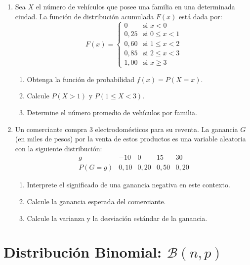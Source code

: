 \documentclass[letterpaper,12pt,spanish]{article}
\begin{document}
\begin{enumerate}[label=\arabic*.]
    \item Sea $X$ el número de vehículos que posee una familia en una determinada ciudad. La función de distribución acumulada $F(x)$ está dada por:
    \[
    F(x) = \begin{cases} 
    0 & \text{si } x < 0 \\
    0{,}25 & \text{si } 0 \le x < 1 \\
    0{,}60 & \text{si } 1 \le x < 2 \\
    0{,}85 & \text{si } 2 \le x < 3 \\
    1{,}00 & \text{si } x \ge 3
    \end{cases}
    \]
    \begin{enumerate}[label=\alph*)]
        \item Obtenga la función de probabilidad $f(x) = P(X = x)$.
        \item Calcule $P(X > 1)$ y $P(1 \le X < 3)$.
        \item Determine el número promedio de vehículos por familia.
    \end{enumerate}

    \item Un comerciante compra 3 electrodomésticos para su reventa. La ganancia $G$ (en miles de pesos) por la venta de estos productos es una variable aleatoria con la siguiente distribución:
    \[
    \begin{array}{c|cccc}
    g & -10 & 0 & 15 & 30 \\ \hline
    P(G = g) & 0{,}10 & 0{,}20 & 0{,}50 & 0{,}20
    \end{array}
    \]
    \begin{enumerate}[label=\alph*)]
        \item Interprete el significado de una ganancia negativa en este contexto.
        \item Calcule la ganancia esperada del comerciante.
        \item Calcule la varianza y la desviación estándar de la ganancia.
    \end{enumerate}
\end{enumerate}

\section{Distribución Binomial: $\mathcal{B}(n, p)$}
\end{document}
